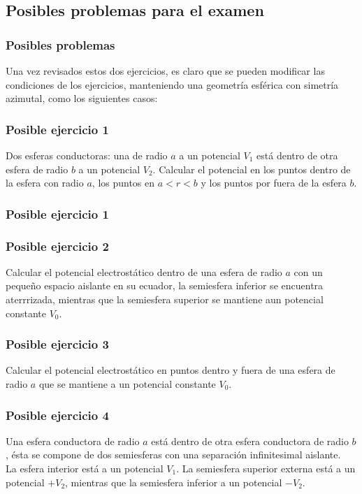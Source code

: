 \subsection{Posibles problemas para el examen}
\begin{frame}
\frametitle{Posibles problemas}
Una vez revisados estos dos ejercicios, es claro que se pueden modificar las condiciones de los ejercicios, manteniendo una geometría esférica con simetría azimutal, como los siguientes casos:
\end{frame}
\begin{frame}
\frametitle{Posible ejercicio 1}
Dos esferas conductoras: una de radio $a$ a un potencial $V_{1}$ está dentro de otra esfera de radio $b$ a un potencial $V_{2}$. Calcular el potencial en los puntos dentro de la esfera con radio $a$, los puntos en $ a < r < b$ y los puntos por fuera de la esfera $b$.
\end{frame}
\begin{frame}
\frametitle{Posible ejercicio 1}
\begin{figure}
    \centering
    
\end{figure}
\end{frame}
\begin{frame}
\frametitle{Posible ejercicio 2}
\fontsize{12}{12}\selectfont
Calcular el potencial electrostático dentro de una esfera de radio $a$ con un pequeño espacio aislante en su ecuador, la semiesfera inferior se encuentra aterrrizada, mientras que la semiesfera superior se mantiene aun potencial constante $V_{0}$.
\begin{figure}
    \centering
    
\end{figure}
\end{frame}
\begin{frame}
\frametitle{Posible ejercicio 3}
\fontsize{12}{12}\selectfont
Calcular el potencial electrostático en puntos dentro y fuera de una esfera de radio $a$ que se mantiene a un potencial constante $V_{0}$.
\begin{figure}
    \centering
    
\end{figure}
\end{frame}
\begin{frame}
\frametitle{Posible ejercicio 4}
Una esfera conductora de radio $a$ está dentro de otra esfera conductora de radio $b$, ésta se compone de dos semiesferas con una separación infinitesimal aislante.
\\
\bigskip
La esfera interior está a un potencial $V_{1}$. La semiesfera superior externa está a un potencial $+V_{2}$, mientras que la semiesfera inferior a un potencial $-V_{2}$.
\end{frame}
